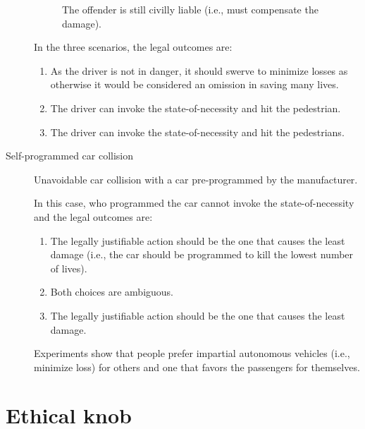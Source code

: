 \begin{description}
\begin{description}
                \begin{remark}
                    The offender is still civilly liable (i.e., must compensate the damage).
                \end{remark}
        \end{description}

        In the three scenarios, the legal outcomes are:
        \begin{enumerate}[label=(\Alph*)]
            \item As the driver is not in danger, it should swerve to minimize losses as otherwise it would be considered an omission in saving many lives.
            \item The driver can invoke the state-of-necessity and hit the pedestrian.
            \item The driver can invoke the state-of-necessity and hit the pedestrians.
        \end{enumerate}


    \item[Self-programmed car collision] 
        Unavoidable car collision with a car pre-programmed by the manufacturer.
        
        In this case, who programmed the car cannot invoke the state-of-necessity and the legal outcomes are:
        \begin{enumerate}[label=(\Alph*)]
            \item The legally justifiable action should be the one that causes the least damage (i.e., the car should be programmed to kill the lowest number of lives).
            \item Both choices are ambiguous.
            \item The legally justifiable action should be the one that causes the least damage.
        \end{enumerate}

        \begin{remark}
            Experiments show that people prefer impartial autonomous vehicles (i.e., minimize loss) for others and one that favors the passengers for themselves.
        \end{remark}
\end{description}



\section{Ethical knob}


